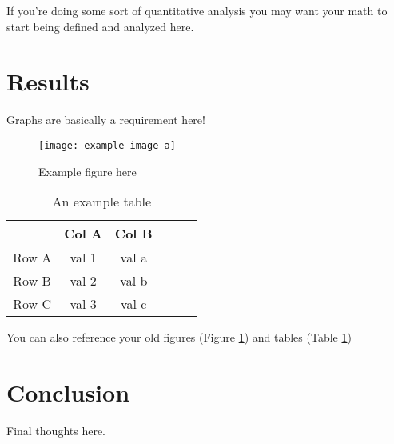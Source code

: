 \documentclass[sigconf]{acmart}
\begin{document}
If you're doing some sort of quantitative analysis you may want your math to 
start being defined and analyzed here.


\section{Results}
Graphs are basically a requirement here!

\begin{figure}[ht]
    \texttt{[image: example-image-a]}
    \caption{Example figure here}
    \label{fig:filler}
\end{figure}

\begin{table}[H]
    \caption{An example table}
	\label{tab:ex}
	\centering

	\begin{tabular}{c |c c c c c}
        \hline\hline
        & Col A & Col B \\
        \hline
        Row A & val 1 & val a \\
        Row B & val 2 & val b \\
        Row C & val 3 & val c \\
	\hline
	\end{tabular}
\end{table}

You can also reference your old figures (Figure \ref{fig:filler}) and tables 
(Table \ref{tab:ex})
\section{Conclusion}

Final thoughts here.

{
    
    
} 
\end{document}
